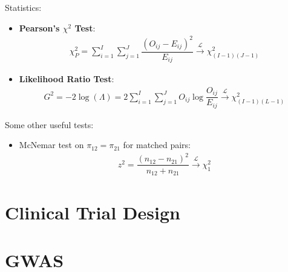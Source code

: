     Statistics:
    \begin{itemize}[topsep=2pt,itemsep=0pt]
        \item \textbf{Pearson's $ \chi^2 $ Test}:
        \begin{align}
            \chi^2_P=\sum_{i=1}^I\sum_{j=1}^J\dfrac{(O_{ij}-E_{ij})^2}{E_{ij}}\xrightarrow[]{\mathscr{L}} \chi^2_{(I-1)(J-1)}
        \end{align}
        
        
        \item \textbf{Likelihood Ratio Test}:
        \begin{align}
            G^2=-2\log(\Lambda )=2\sum_{i=1}^I\sum_{j=1}^JO_{ij}\log\dfrac{O_{ij}}{E_{ij}}\xrightarrow[]{\mathscr{L}} \chi^2_{(I-1)(L-1)} 
        \end{align}
    \end{itemize}
    
    Some other useful tests:
    \begin{itemize}[topsep=2pt,itemsep=0pt]
        \item McNemar test on $ \pi_{12}=\pi_{21} $ for matched pairs:
        \begin{align}
            z^2=\dfrac{(n_{12}-n_{21})^2}{{n_{12}+n_{21}}} \xrightarrow[]{\mathscr{L}} \chi^2_1
        \end{align}
        
        
    \end{itemize}
    
        

\section{Clinical Trial Design}
\section{GWAS}






